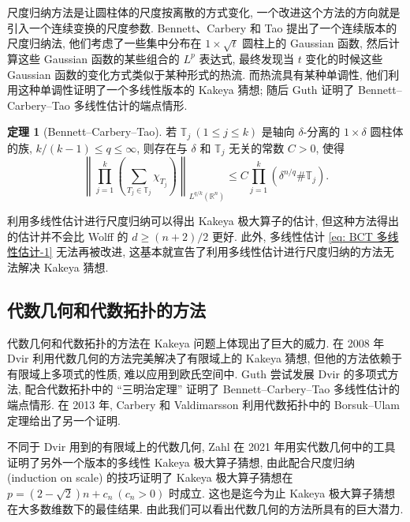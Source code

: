 \documentclass[a4paper]{article}
\numberwithin{equation}{section}
\numberwithin{figure}{section}
\numberwithin{table}{section}
\theoremstyle{definition}
\newtheorem{theorem}{\indent 定理}[section]
\newcommand{\norm}[1]{\left\lVert #1 \right\rVert}
\renewcommand{\leq}{\leqslant}
\renewcommand{\geq}{\geqslant}
\newcommand{\mb}[1]{\mathbb{#1}}
\newcommand{\R}{\mathbb{R}}
\begin{document}
尺度归纳方法是让圆柱体的尺度按离散的方式变化, 一个改进这个方法的方向就是引入一个连续变换的尺度参数. Bennett、Carbery 和 Tao 提出了一个连续版本的尺度归纳法, 他们考虑了一些集中分布在 $1\times\sqrt{t}$ 圆柱上的 Gaussian 函数, 然后计算这些 Gaussian 函数的某些组合的 $L^p$ 表达式, 最终发现当 $t$ 变化的时候这些 Gaussian 函数的变化方式类似于某种形式的热流. 而热流具有某种单调性, 他们利用这种单调性证明了一个多线性版本的 Kakeya 猜想\cite{bennett2006multilinear}; 随后 Guth 证明了 Bennett--Carbery--Tao 多线性估计的端点情形\cite{guth2010endpoint}.

\begin{theorem}[Bennett--Carbery--Tao]
    若 $\mb{T}_j\ (1\leq j\leq k)$ 是轴向 $\delta$-分离的 $1\times\delta$ 圆柱体的族, ${k}/{(k-1)}\leq q\leq\infty$, 则存在与 $\delta$ 和 $\mb{T}_j$ 无关的常数 $C>0$, 使得
    \begin{equation}
        \label{eq: BCT 多线性估计-1}
        \norm{\prod_{j=1}^k\left(\sum_{T_j\in\mb{T}_j}\chi_{T_j}\right)}_{L^{q/k}(\R^n)}\leq C\prod_{j=1}^k\left(\delta^{n/q}\#\mb{T}_j\right).
    \end{equation} 
\end{theorem}

利用多线性估计进行尺度归纳可以得出 Kakeya 极大算子的估计, 但这种方法得出的估计并不会比 Wolff 的 $d\geq (n+2)/2$ 更好. 此外, 多线性估计 \eqref{eq: BCT 多线性估计-1} 无法再被改进, 这基本就宣告了利用多线性估计进行尺度归纳的方法无法解决 Kakeya 猜想.

\subsection{代数几何和代数拓扑的方法}

代数几何和代数拓扑的方法在 Kakeya 问题上体现出了巨大的威力. 在 2008 年 Dvir 利用代数几何的方法完美解决了有限域上的 Kakeya 猜想\cite{dvir2009size}, 但他的方法依赖于有限域上多项式的性质, 难以应用到欧氏空间中. Guth 尝试发展 Dvir 的多项式方法, 配合代数拓扑中的 ``三明治定理'' 证明了 Bennett--Carbery--Tao 多线性估计的端点情形.\cite{guth2010endpoint} 在 2013 年, Carbery 和 Valdimarsson 利用代数拓扑中的 Borsuk--Ulam 定理给出了另一个证明.\cite{carbery2013endpoint}

不同于 Dvir 用到的有限域上的代数几何, Zahl 在 2021 年用实代数几何中的工具证明了另外一个版本的多线性 Kakeya 极大算子猜想, 由此配合尺度归纳 (induction on scale) 的技巧证明了 Kakeya 极大算子猜想在 $p=(2-\sqrt{2})n + c_n\ (c_n>0)$ 时成立. 这也是迄今为止 Kakeya 极大算子猜想在大多数维数下的最佳结果.\cite{zahl2021new} 由此我们可以看出代数几何的方法所具有的巨大潜力.
\end{document}
